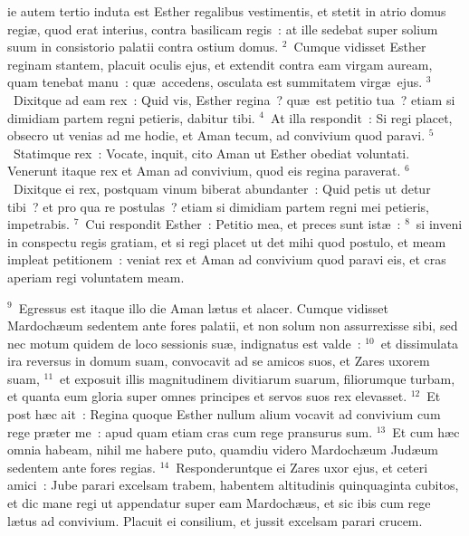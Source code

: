 \bchapter
{}ie autem tertio induta est Esther regalibus vestimentis, et stetit in atrio domus regi\ae , quod erat interius, contra basilicam regis~: at ille sedebat super solium suum in consistorio palatii contra ostium domus.
${}^{2}$~Cumque vidisset Esther reginam stantem, placuit oculis ejus, et extendit contra eam virgam auream, quam tenebat manu~: qu\ae\ accedens, osculata est summitatem virg\ae\ ejus.
${}^{3}$~Dixitque ad eam rex~: Quid vis, Esther regina~? qu\ae\ est petitio tua~? etiam si dimidiam partem regni petieris, dabitur tibi.
${}^{4}$~At illa respondit~: Si regi placet, obsecro ut venias ad me hodie, et Aman tecum, ad convivium quod paravi.
${}^{5}$~Statimque rex~: Vocate, inquit, cito Aman ut Esther obediat voluntati. Venerunt itaque rex et Aman ad convivium, quod eis regina paraverat.
${}^{6}$~Dixitque ei rex, postquam vinum biberat abundanter~: Quid petis ut detur tibi~? et pro qua re postulas~? etiam si dimidiam partem regni mei petieris, impetrabis.
${}^{7}$~Cui respondit Esther~: Petitio mea, et preces sunt ist\ae~:
${}^{8}$~si inveni in conspectu regis gratiam, et si regi placet ut det mihi quod postulo, et meam impleat petitionem~: veniat rex et Aman ad convivium quod paravi eis, et cras aperiam regi voluntatem meam.


${}^{9}$~Egressus est itaque illo die Aman l\ae tus et alacer. Cumque vidisset Mardoch\ae um sedentem ante fores palatii, et non solum non assurrexisse sibi, sed nec motum quidem de loco sessionis su\ae , indignatus est valde~:
${}^{10}$~et dissimulata ira reversus in domum suam, convocavit ad se amicos suos, et Zares uxorem suam,
${}^{11}$~et exposuit illis magnitudinem divitiarum suarum, filiorumque turbam, et quanta eum gloria super omnes principes et servos suos rex elevasset.
${}^{12}$~Et post h\ae c ait~: Regina quoque Esther nullum alium vocavit ad convivium cum rege pr\ae ter me~: apud quam etiam cras cum rege pransurus sum.
${}^{13}$~Et cum h\ae c omnia habeam, nihil me habere puto, quamdiu videro Mardoch\ae um Jud\ae um sedentem ante fores regias.
${}^{14}$~Responderuntque ei Zares uxor ejus, et ceteri amici~: Jube parari excelsam trabem, habentem altitudinis quinquaginta cubitos, et dic mane regi ut appendatur super eam Mardoch\ae us, et sic ibis cum rege l\ae tus ad convivium. Placuit ei consilium, et jussit excelsam parari crucem.

